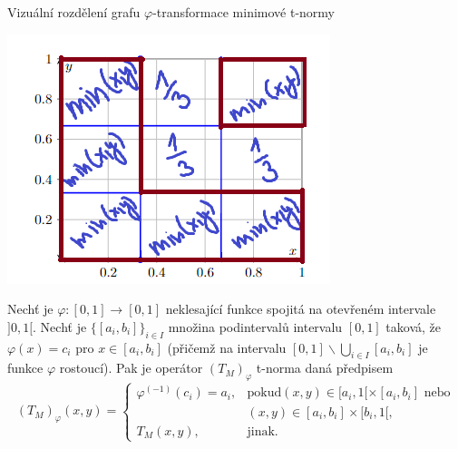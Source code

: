 \begin{graph}Vizu\' aln\' i rozd\v elen\'i grafu $\varphi$-transformace minimov\' e t-normy\\


\tikzset{>=stealth}
\centering
\includegraphics[scale=0.8]{template-fig/phi-tnorm.png}
\end{graph}
\begin{sentence}
\cite{smutna}
 Nech\v t je $\varphi:[0,1]\rightarrow [0,1]$
neklesající funkce spojitá na otevřeném intervale $]0,1[$.
Nech\v t je $\{[a_i,b_i]\}_{i\in I}$ množina podinterval\r u
intervalu $[0,1]$ taková, že $\varphi(x)=c_i$ pro $x\in
[a_i,b_i]$ (přičemž na intervalu $[0,1]\backslash \bigcup \limits_{i \in I}
[a_i,b_i]$ je funkce $\varphi$
rostoucí).
Pak je operátor $(T_M)_{\varphi}$  t-norma daná předpisem
$$ (T_M)_{\varphi}(x,y) = \begin{cases} \varphi^{(-1)}(c_i)=a_i, &\mbox {pokud
$(x,y)\in [a_i,1[\times[a_i,b_i]$ nebo}
\\ & (x,y)\in [a_i,b_i]\times[b_i,1[,
\\ T_M(x,y), &\mbox {jinak.}
\end{cases} $$
\end{sentence}

